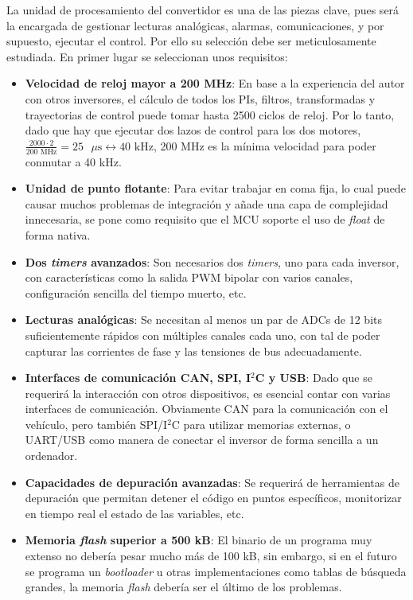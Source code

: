 La unidad de procesamiento del convertidor es una de las piezas clave, pues será la encargada de gestionar lecturas analógicas, alarmas, comunicaciones, y por supuesto, ejecutar el control. Por ello su selección debe ser meticulosamente estudiada. En primer lugar se seleccionan unos requisitos:

\begin{itemize}
	\item \textbf{Velocidad de reloj mayor a 200 MHz}: En base a la experiencia del autor con otros inversores, el cálculo de todos los PIs, filtros, transformadas y trayectorias de control puede tomar hasta 2500 ciclos de reloj. Por lo tanto, dado que hay que ejecutar dos lazos de control para los dos motores, $\frac{2000 \cdot 2}{200 \text{ MHz}} = 25 \text{ }\mu\text{s} \leftrightarrow 40 \text{ kHz}$, 200 MHz es la mínima velocidad para poder conmutar a 40 kHz.
	\item \textbf{Unidad de punto flotante}: Para evitar trabajar en coma fija, lo cual puede causar muchos problemas de integración y añade una capa de complejidad innecesaria, se pone como requisito que el MCU soporte el uso de \textit{float} de forma nativa.
	\item \textbf{Dos \textit{timers} avanzados}: Son necesarios dos \textit{timers}, uno para cada inversor, con características como la salida PWM bipolar con varios canales, configuración sencilla del tiempo muerto, etc.
	\item \textbf{Lecturas analógicas}: Se necesitan al menos un par de ADCs de 12 bits suficientemente rápidos con múltiples canales cada uno, con tal de poder capturar las corrientes de fase y las tensiones de bus adecuadamente.
	\item \textbf{Interfaces de comunicación CAN, SPI, I$^2$C y USB}: Dado que se requerirá la interacción con otros dispositivos, es esencial contar con varias interfaces de comunicación. Obviamente CAN para la comunicación con el vehículo, pero también SPI/I$^2$C para utilizar memorias externas, o UART/USB como manera de conectar el inversor de forma sencilla a un ordenador.
	\item \textbf{Capacidades de depuración avanzadas}: Se requerirá de herramientas de depuración que permitan detener el código en puntos específicos, monitorizar en tiempo real el estado de las variables, etc.
	\item \textbf{Memoria \textit{flash} superior a 500 kB}: El binario de un programa muy extenso no debería pesar mucho más de 100 kB, sin embargo, si en el futuro se programa un \textit{bootloader} u otras implementaciones como tablas de búsqueda grandes, la memoria \textit{flash} debería ser el último de los problemas.
	
\end{itemize}

